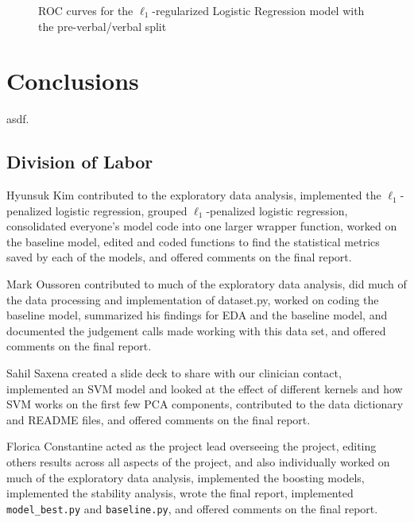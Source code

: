 \documentclass[11pt, letterpaper]{amsart}
\let\Oldsection\section
\renewcommand{\section}{\FloatBarrier\Oldsection}
\let\Oldsubsection\subsection
\renewcommand{\subsection}{\FloatBarrier\Oldsubsection}
\begin{document}
\begin{figure}
\begin{minipage}[b]{0.5\linewidth}
		\label{fig:lr_test_roc_vb}
	\end{minipage}
	\caption{ROC curves for the $\ell_1$-regularized Logistic Regression model with the pre-verbal/verbal split}\label{fig:lr_roc_vb}
\end{figure}

\section{Conclusions}
asdf.

\subsection{Division of Labor}

Hyunsuk Kim contributed to the exploratory data analysis, implemented the $\ell_1$-penalized logistic regression, grouped $\ell_1$-penalized logistic regression, consolidated everyone's model code into one larger wrapper function, worked on the baseline model, edited and coded functions to find the statistical metrics saved by each of the models, and offered comments on the final report.

Mark Oussoren contributed to much of the exploratory data analysis, did much of the data processing and implementation of dataset.py, worked on coding the baseline model, summarized his findings for EDA and the baseline model, and documented the judgement calls made working with this data set, and offered comments on the final report.

Sahil Saxena created a slide deck to share with our clinician contact, implemented an SVM model and looked at the effect of different kernels and how SVM works on the first few PCA components, contributed to the data dictionary and README files, and offered comments on the final report.

Florica Constantine acted as the project lead overseeing the project, editing others results across all aspects of the project, and also individually worked on much of the exploratory data analysis, implemented the boosting models, implemented the stability analysis, wrote the final report, implemented \texttt{model\_best.py} and \texttt{baseline.py}, and offered comments on the final report.

\printbibliography
\end{document}
